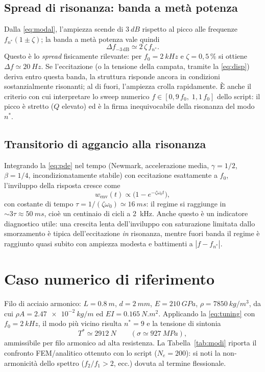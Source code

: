 \documentclass[11pt,a4paper]{article}
\begin{document}
\subsection{Spread di risonanza: banda a met\`a potenza}
Dalla \eqref{eq:modal}, l'ampiezza scende di $\SI{3}{dB}$ rispetto al picco
alle frequenze $f_{n^\ast}(1 \pm \zeta)$; la banda a met\`a potenza vale
quindi
\begin{equation}
\Delta f_{-3\,\mathrm{dB}} \simeq 2\,\zeta\, f_{n^\ast}.
\label{eq:band}
\end{equation}
Questo \`e lo \emph{spread} fisicamente rilevante: per
$f_0 = \SI{2}{kHz}$ e $\zeta = 0{,}5\,\%$ si ottiene
$\Delta f \simeq \SI{20}{Hz}$. Se l'eccitazione (o la tensione della campata,
tramite la \eqref{eq:disp}) deriva entro questa banda, la struttura risponde
ancora in condizioni sostanzialmente risonanti; al di fuori, l'ampiezza crolla
rapidamente. \`E anche il criterio con cui interpretare lo sweep numerico
$f \in [0{,}9\,f_0,\;1{,}1\,f_0]$ dello script: il picco \`e stretto
($Q$ elevato) ed \`e la firma inequivocabile della risonanza del modo
$n^\ast$.

\subsection{Transitorio di aggancio alla risonanza}
Integrando la \eqref{eq:pde} nel tempo (Newmark, accelerazione media,
$\gamma = 1/2$, $\beta = 1/4$, incondizionatamente stabile) con eccitazione
esattamente a $f_0$, l'inviluppo della risposta cresce come
\begin{equation}
w_{\mathrm{env}}(t) \propto
\bigl(1 - e^{-\zeta\omega_0 t}\bigr),
\end{equation}
con costante di tempo $\tau = 1/(\zeta\omega_0) \simeq \SI{16}{ms}$: il regime
si raggiunge in $\sim 3\tau \approx \SI{50}{ms}$, cio\`e un centinaio di cicli
a \SI{2}{kHz}. Anche questo \`e un indicatore diagnostico utile: una crescita
lenta dell'inviluppo con saturazione limitata dallo smorzamento \`e tipica
dell'eccitazione \emph{in} risonanza, mentre fuori banda il regime \`e
raggiunto quasi subito con ampiezza modesta e battimenti a
$|f - f_{n^\ast}|$.

\section{Caso numerico di riferimento}
\label{sec:num}
Filo di acciaio armonico: $L = \SI{0.8}{m}$, $d = \SI{2}{mm}$,
$E = \SI{210}{GPa}$, $\rho = \SI{7850}{kg/m^3}$, da cui
$\rho A = \SI{2.47e-2}{kg/m}$ ed $EI = \SI{0.165}{N.m^2}$. Applicando la
\eqref{eq:tuning} con $f_0 = \SI{2}{kHz}$, il modo pi\`u vicino risulta
$n^\ast = 9$ e la tensione di sintonia
\begin{equation*}
T^\ast \simeq \SI{2912}{N}
\qquad (\sigma \simeq \SI{927}{MPa}),
\end{equation*}
ammissibile per filo armonico ad alta resistenza. La
Tabella~\ref{tab:modi} riporta il confronto FEM/analitico ottenuto con lo
script ($N_e = 200$): si noti la non-armonicit\`a dello spettro
($f_2/f_1 > 2$, ecc.) dovuta al termine flessionale.
\end{document}
